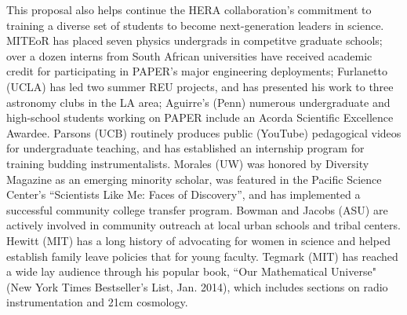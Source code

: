 \documentclass[preprint]{aastex}
\begin{document}
This proposal also helps continue the HERA
collaboration's commitment to
training a diverse set of students to become next-generation
leaders in science.  MITEoR has placed seven physics undergrads 
in competitve graduate schools; over a dozen interns from South African
universities have received academic credit for participating in 
PAPER's major engineering deployments;
 Furlanetto (UCLA)
has led two summer REU projects, and has
presented his work to three astronomy clubs in the LA area; %
Aguirre's (Penn)
numerous undergraduate and high-school students working on PAPER
include an Acorda Scientific Excellence Awardee.
Parsons (UCB) routinely produces
public (YouTube) pedagogical videos for undergraduate teaching, and has established
an internship program for training budding instrumentalists.
Morales (UW) was honored by Diversity Magazine as an 
emerging minority scholar, was featured in the Pacific Science
Center’s ``Scientists Like Me: Faces of Discovery'', and has
implemented a successful community college transfer program. 
Bowman and Jacobs (ASU) are actively involved in community outreach at
local urban schools and tribal centers. Hewitt (MIT) has a long history of advocating
for women in science and helped establish
family leave policies that for young faculty.
Tegmark (MIT) has reached a wide lay audience through his popular book,
``Our Mathematical Universe" (New York Times Bestseller's List, Jan. 2014),
which includes sections on radio instrumentation and 21cm cosmology.

\end{document}
